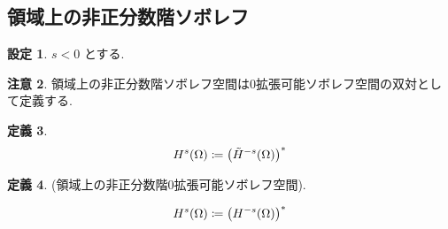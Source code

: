 \documentclass[10pt, fleqn, label-section=none]{bxjsarticle}
\theoremstyle{definition}
\newtheorem{dfn}{定義}[section]
\newtheorem{setting}[dfn]{設定}
\newtheorem{remark}[dfn]{注意}
\newcommand{\paren}[1]{\mleft( #1\mright )}
\renewcommand{\;}{\, ; \,}
\begin{document}
\subsection{領域上の非正分数階ソボレフ}

\begin{setting}
$s < 0$ とする. 
\end{setting}

\begin{remark}領域上の非正分数階ソボレフ空間は$0$拡張可能ソボレフ空間の双対として定義する. 


\end{remark}

\begin{dfn}

\begin{align*}  H^s(\Omega ) \coloneqq \paren{\tilde H^{-s}(\Omega)}^*   \end{align*}

\end{dfn}


\begin{dfn}(領域上の非正分数階$0$拡張可能ソボレフ空間). 

\begin{align*}  H^s(\Omega ) \coloneqq \paren{ H^{-s}(\Omega)}^* \end{align*}

\end{dfn}
\end{document}
